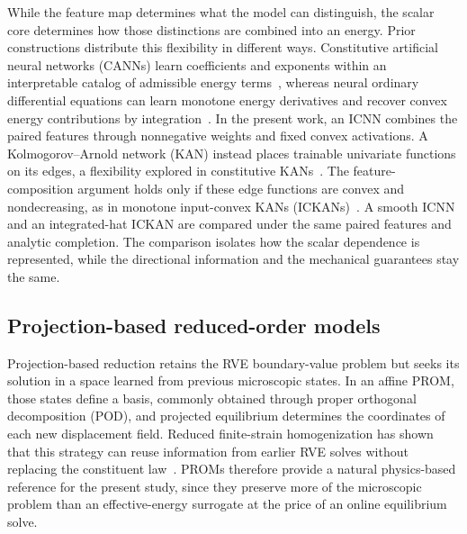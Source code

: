 While the feature map determines what the model can distinguish, the scalar core determines how those distinctions are combined into an energy. Prior constructions distribute this flexibility in different ways. Constitutive artificial neural networks (CANNs) learn coefficients and exponents within an interpretable catalog of admissible energy terms~\cite{Linka2023}, whereas neural ordinary differential equations can learn monotone energy derivatives and recover convex energy contributions by integration~\cite{Tac2022}. In the present work, an ICNN combines the paired features through nonnegative weights and fixed convex activations. A Kolmogorov--Arnold network (KAN) instead places trainable univariate functions on its edges, a flexibility explored in constitutive KANs~\cite{Abdolazizi2025}. The feature-composition argument holds only if these edge functions are convex and nondecreasing, as in monotone input-convex KANs (ICKANs)~\cite{thakolkaran2025}. A smooth ICNN and an integrated-hat ICKAN are compared under the same paired features and analytic completion. The comparison isolates how the scalar dependence is represented, while the directional information and the mechanical guarantees stay the same.

\subsection{Projection-based reduced-order models}
Projection-based reduction retains the RVE boundary-value problem but seeks its solution in a space learned from previous microscopic states. In an affine PROM, those states define a basis, commonly obtained through proper orthogonal decomposition (POD), and projected equilibrium determines the coordinates of each new displacement field. Reduced finite-strain homogenization has shown that this strategy can reuse information from earlier RVE solves without replacing the constituent law~\cite{yvonnet2007,Hernandez2014,Hernandez2020}. PROMs therefore provide a natural physics-based reference for the present study, since they preserve more of the microscopic problem than an effective-energy surrogate at the price of an online equilibrium solve.

